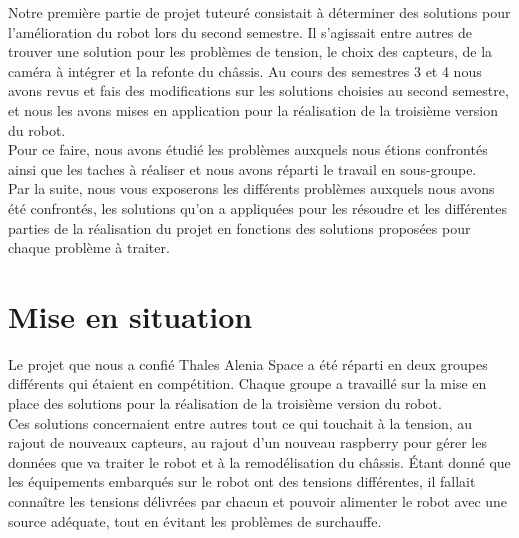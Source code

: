 \documentclass{PackagerQualityN}
\begin{document}
Notre première partie de projet tuteuré consistait à déterminer des solutions pour l’amélioration du robot lors du second semestre. Il s’agissait entre autres de trouver une solution pour les problèmes de tension, le choix des capteurs, de la caméra à intégrer et la refonte du châssis. Au cours des semestres 3 et 4 nous avons revus et fais des modifications sur les solutions choisies au second semestre, et nous les avons mises en application pour la réalisation de la troisième version du robot.\\

Pour ce faire, nous avons étudié les problèmes auxquels nous étions confrontés ainsi que les taches à réaliser et nous avons réparti le travail en sous-groupe.\\

Par la suite, nous vous exposerons les différents problèmes auxquels nous avons été confrontés, les solutions qu’on a appliquées pour les résoudre et les différentes parties de la réalisation du projet en fonctions des solutions proposées pour chaque problème à traiter.\\





\newp       %
\paragraph{}

\section{Mise en situation}

Le projet que nous a confié Thales Alenia Space a été réparti en deux groupes différents qui étaient en compétition. Chaque groupe a travaillé sur la mise en place des solutions pour la réalisation de la troisième version du robot.\\

Ces solutions concernaient entre autres tout ce qui touchait à la tension, au rajout de nouveaux capteurs, au rajout d'un nouveau raspberry pour gérer les données que va traiter le robot et à la remodélisation du châssis. Étant donné que les équipements embarqués sur le robot ont des tensions différentes, il fallait  connaître les tensions délivrées par chacun et pouvoir alimenter le robot avec une source adéquate, tout en évitant les problèmes de surchauffe.\\
\end{document}
